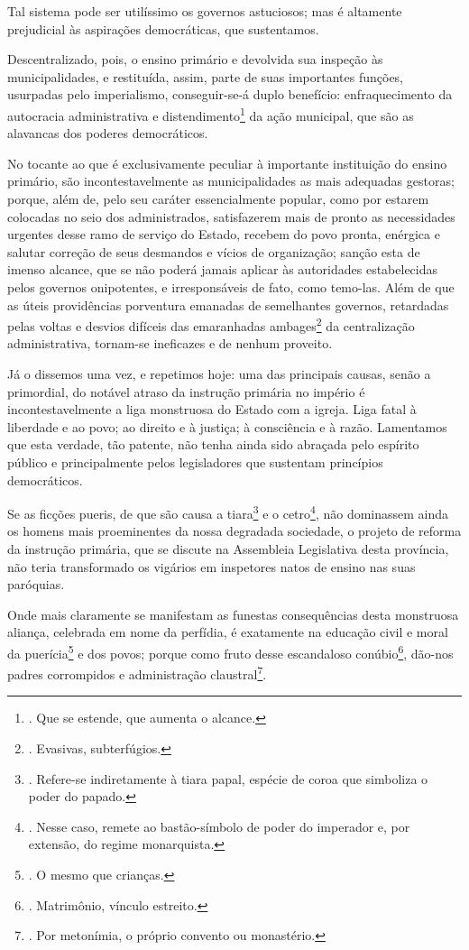 Tal sistema pode ser utilíssimo os governos astuciosos; mas é altamente
prejudicial às aspirações democráticas, que sustentamos.

Descentralizado, pois, o ensino primário e devolvida sua inspeção às
municipalidades, e restituída, assim, parte de suas importantes funções,
usurpadas pelo imperialismo, conseguir-se-á duplo benefício:
enfraquecimento da autocracia administrativa e distendimento\footnote{.
  Que se estende, que aumenta o alcance.} da ação municipal, que são as
alavancas dos poderes democráticos.

No tocante ao que é exclusivamente peculiar à importante instituição do
ensino primário, são incontestavelmente as municipalidades as mais
adequadas gestoras; porque, além de, pelo seu caráter essencialmente
popular, como por estarem colocadas no seio dos administrados,
satisfazerem mais de pronto as necessidades urgentes desse ramo de
serviço do Estado, recebem do povo pronta, enérgica e salutar correção
de seus desmandos e vícios de organização; sanção esta de imenso
alcance, que se não poderá jamais aplicar às autoridades estabelecidas
pelos governos onipotentes, e irresponsáveis de fato, como temo-las.
Além de que as úteis providências porventura emanadas de semelhantes
governos, retardadas pelas voltas e desvios difíceis das emaranhadas
ambages\footnote{. Evasivas, subterfúgios.} da centralização
administrativa, tornam-se ineficazes e de nenhum proveito.

Já o dissemos uma vez, e repetimos hoje: uma das principais causas,
senão a primordial, do notável atraso da instrução primária no império é
incontestavelmente a liga monstruosa do Estado com a igreja. Liga fatal
à liberdade e ao povo; ao direito e à justiça; à consciência e à razão.
Lamentamos que esta verdade, tão patente, não tenha ainda sido abraçada
pelo espírito público e principalmente pelos legisladores que sustentam
princípios democráticos.

Se as ficções pueris, de que são causa a tiara\footnote{. Refere-se
  indiretamente à tiara papal, espécie de coroa que simboliza o poder do
  papado.} e o cetro\footnote{. Nesse caso, remete ao bastão-símbolo de
  poder do imperador e, por extensão, do regime monarquista.}, não
dominassem ainda os homens mais proeminentes da nossa degradada
sociedade, o projeto de reforma da instrução primária, que se discute na
Assembleia Legislativa desta província, não teria transformado os
vigários em inspetores natos de ensino nas suas paróquias.

Onde mais claramente se manifestam as funestas consequências desta
monstruosa aliança, celebrada em nome da perfídia, é exatamente na
educação civil e moral da puerícia\footnote{. O mesmo que crianças.} e
dos povos; porque como fruto desse escandaloso conúbio\footnote{.
  Matrimônio, vínculo estreito.}, dão-nos padres corrompidos e
administração claustral\footnote{. Por metonímia, o próprio convento ou
  monastério.}.

